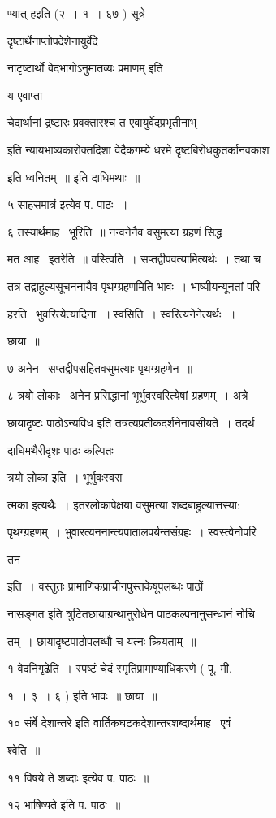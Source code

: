 \documentclass[11pt, openany]{book}
\begin{document}
ण्यात् हइति (२~। १~। ६७ ) सूत्रे {\qt दृष्टार्थेनाप्तोपदेशेनायुर्वेदे \textendash\ 

नाटृष्टार्थो वेदभागोऽनुमातव्यः प्रमाणम् इति} य एवाप्ता 

चेदार्थानां द्रष्टारः प्रवक्तारश्च त एवायुर्वेदप्रभृतीनाभ् \textendash\ 

इति न्यायभाष्यकारोक्तदिशा वेदैकगम्ये धरमे दृष्टबिरोधकुतर्कानवकाश 

इति ध्वनितम्~॥ इति दाधिमथाः~॥ 

५ {\qt साहसमात्रं इत्येव प. पाठः~॥} 

६ तस्यार्थमाह \textendash\ भूरिति~॥ नन्वनेनैव वसुमत्या ग्रहणं सिद्ध \textendash\ 

मत आह \textendash\ इतरेति~॥ वस्त्विति~। सप्तद्वीपवत्यामित्यर्थः~। तथा च 

तत्र तद्वाहुल्यसूचननायैव पृथग्ग्रहणमिति भावः~। भाष्यीयन्यूनतां परि \textendash\ 

हरति \textendash\ भुवरित्येत्यादिना~॥ स्वसिति~। स्वरित्यनेनेत्यर्थः~॥ 

छाया~॥ 

७ अनेन \textendash\ सप्तद्वीपसहितवसुमत्याः पृथग्ग्रहणेन~॥ 

८ त्रयो लोकाः \textendash\ अनेन प्रसिद्धानां भूर्भुवस्वरित्येषां ग्रहणम्~। अत्रे 

छायादृष्टः पाठोऽन्यविध इति तत्रत्यप्रतीकदर्शनेनावसीयते~। तदर्थ 

दाधिमथैरीदृशः पाठः कल्पितः \textendash\ {\qt त्रयो लोका इति~। भूर्भुवःस्वरा \textendash\ 

त्मका इत्यथैः~। इतरलोकापेक्षया वसुमत्या शब्दबाहुल्यात्तस्या: 

पृथग्ग्रहणम्~। भुवारत्यननान्त्यपातालपर्यन्तसंग्रहः~। स्वस्त्वेनोपरि \textendash\ 

तन \textendash\ } इति~। वस्तुतः प्रामाणिकप्राचीनपुस्तकेषूपलब्धः पाठों 

नासङ्गत इति त्रुटितछायाग्रन्थानुरोधेन पाठकल्पनानुसन्धानं नोचि \textendash\ 

तम्~। छायादृष्टपाठोपलब्धौ च यत्नः क्रियताम्~॥ 

१ वेदनिगृढेति~। स्पष्टं चेदं स्मृतिप्रामाण्याधिकरणे ( पू. मी. 

१~। ३~। ६ ) इति भावः~॥ छाया~॥ 

१० संर्बे देशान्तरे इति वार्तिकघटकदेशान्तरशब्दार्थमाह \textendash\ ए्वं 

श्वेति~॥ 

११ विषये ते शब्दाः इत्येव प. पाठः~॥ 

१२ भाषिष्यते इति प. पाठः~॥ 
\end{document}
